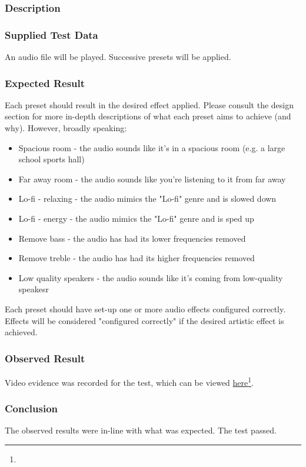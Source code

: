 \subsubsection{Description}
\paragraph{}
{
	\centering
}

\subsubsection{Supplied Test Data}
An audio file will be played. Successive presets will be applied.

\subsubsection{Expected Result}
Each preset should result in the desired effect applied. Please consult the design section for more in-depth descriptions of what each preset aims to achieve (and why). However, broadly speaking:
\begin{itemize}
	\item Spacious room - the audio sounds like it's in a spacious room (e.g. a large school sports hall)
	\item Far away room - the audio sounds like you're listening to it from far away
	\item Lo-fi - relaxing - the audio mimics the "Lo-fi" genre and is slowed down
	\item Lo-fi - energy - the audio mimics the "Lo-fi" genre and is sped up
	\item Remove bass - the audio has had its lower frequencies removed
	\item Remove treble - the audio has had its higher frequencies removed
	\item Low quality speakers - the audio sounds like it's coming from low-quality speakesr
\end{itemize}
Each preset should have set-up one or more audio effects configured correctly. Effects will be considered "configured correctly" if the desired artistic effect is achieved.

\subsubsection{Observed Result}
\label{sec:evidence5.4}
Video evidence was recorded for the test, which can be viewed \href{}{here}\footnote{
	
}.

\subsubsection{Conclusion}
The observed results were in-line with what was expected. The test passed.